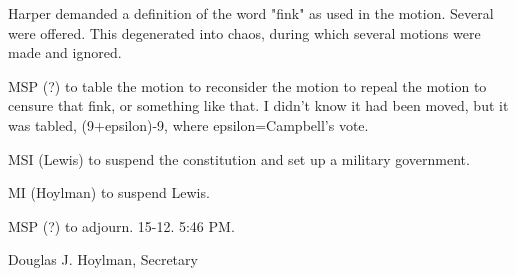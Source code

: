 \documentclass[12pt]{article}
\begin{document}
Harper demanded a definition of the word "fink" as used in the motion. Several were offered. This degenerated into chaos, during which several motions were made and ignored.

MSP (?) to table the motion to reconsider the motion to repeal the motion to censure that fink, or something like that. I didn't know it had been moved, but it was tabled, (9+epsilon)-9, where epsilon=Campbell's vote.

MSI (Lewis) to suspend the constitution and set up a military government.

MI (Hoylman) to suspend Lewis.

MSP (?) to adjourn. 15-12. 5:46 PM.

\vspace{12pt}

\centerline{Douglas J. Hoylman, Secretary}
\end{document}

